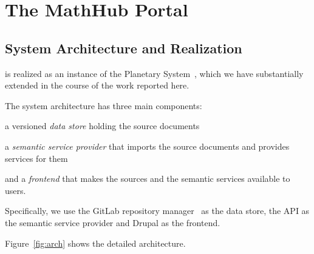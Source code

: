 \section{The MathHub Portal}\label{sec:mathhub}

\subsection{ System Architecture and Realization}\label{sec:arch}

\sys is realized as an instance of the Planetary System~\cite{Kohlhase:ppte12}, which we have substantially extended in the course of the work reported here. 

The system architecture has three main components: 
\begin{inparaenum}[\em i\rm)]
 \item a versioned \emph{data store} holding the source documents
 \item a \emph{semantic service provider} that imports the source documents and provides services for them 
 \item and a \emph{frontend} that makes the sources and the semantic services available to users.
\end{inparaenum}
Specifically, we use the GitLab repository manager~\cite{GitLab:on} as the data store, the \mmt API as the semantic service provider and Drupal as the frontend. 

Figure~\ref{fig:arch} shows the detailed architecture.

